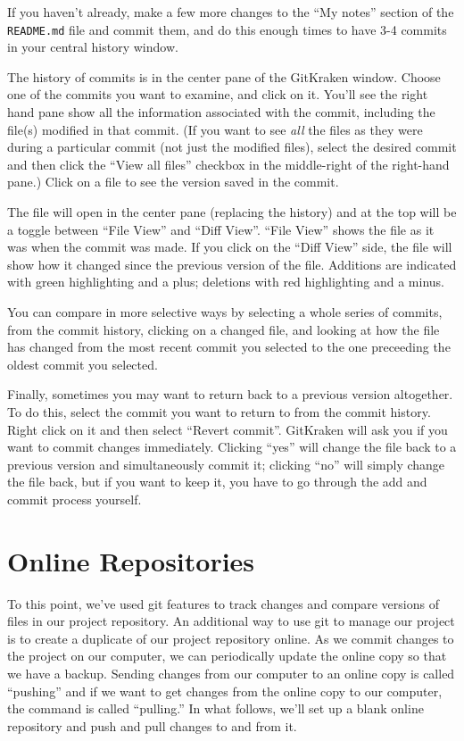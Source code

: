\documentclass[]{Nemilov}
\begin{document}
If you haven't already, make a few more changes to the ``My notes'' section of the
\texttt{README.md} file
and commit them, and do this enough times to have 3-4 commits in your central
history window.

The history of commits is in the center pane of the GitKraken
window. Choose one of the commits you want to examine, and click on it.
You'll see the right hand pane show
all the information associated with the commit, including the file(s)
modified in that commit. (If you want to see \emph{all} the files as they were during a particular commit
(not just the modified files), select the desired commit and then click the
``View all files'' checkbox in the middle-right of the right-hand pane.)
Click on a file to see the version saved in the commit.

The file will open in the center pane (replacing the history) and at the
top will be a toggle between ``File View'' and ``Diff View''. ``File View'' shows the
file as it was when the commit was made. If you click on
the ``Diff View'' side, the file will show how it changed since the previous
version of the file. Additions are indicated with green highlighting and a plus; deletions
with red highlighting and a minus.

You can compare in more selective ways by selecting a whole series of commits,
from the commit history, clicking on a changed file, and looking at how the
file has changed from the most recent commit you selected to the one preceeding
the oldest commit you selected.

Finally, sometimes you may want to return back to a previous version altogether.
To do this, select the commit you want to return to from the commit history.
Right click on it and then select ``Revert commit''. GitKraken will ask you if
you want to commit changes immediately. Clicking ``yes'' will change the file back
to a previous version and simultaneously commit it; clicking ``no'' will simply
change the file back, but if you want to keep it, you have to go through the
add and commit process yourself.

\hypertarget{py-version-control-remote}{%
\section{Online Repositories}\label{py-version-control-remote}}

To this point, we've used git features to track changes and compare versions
of files in our project repository. An additional way to use git to manage our
project is to create a duplicate of our project repository online. As we commit
changes to the project on our computer, we can periodically update the online
copy so that we have a backup. Sending changes from our computer to an online
copy is called ``pushing'' and if we want to get changes from the online copy to
our computer, the command is called ``pulling.'' In what follows, we'll set up
a blank online repository and push and pull changes to and from it.
\end{document}
